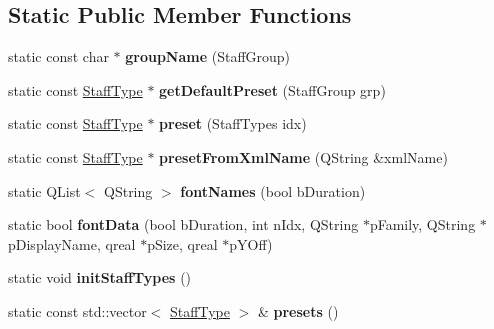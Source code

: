 \subsection*{Static Public Member Functions}
\begin{DoxyCompactItemize}
\item 
\mbox{\label{class_ms_1_1_staff_type_ae6db1131f3d20a99edd92957e6c57c04}} 
static const char $\ast$ {\bfseries group\+Name} (Staff\+Group)
\item 
\mbox{\label{class_ms_1_1_staff_type_afe6ed22d56e84a04c80e666ecccd9e0d}} 
static const \hyperlink{class_ms_1_1_staff_type}{Staff\+Type} $\ast$ {\bfseries get\+Default\+Preset} (Staff\+Group grp)
\item 
\mbox{\label{class_ms_1_1_staff_type_a9c32ffbc0aaac4b987b61bb35777f093}} 
static const \hyperlink{class_ms_1_1_staff_type}{Staff\+Type} $\ast$ {\bfseries preset} (Staff\+Types idx)
\item 
\mbox{\label{class_ms_1_1_staff_type_ac830caf5d8a1f2a0dc426ec40fc3d049}} 
static const \hyperlink{class_ms_1_1_staff_type}{Staff\+Type} $\ast$ {\bfseries preset\+From\+Xml\+Name} (Q\+String \&xml\+Name)
\item 
\mbox{\label{class_ms_1_1_staff_type_af8f369415a01c6d7b8a170355e5d4137}} 
static Q\+List$<$ Q\+String $>$ {\bfseries font\+Names} (bool b\+Duration)
\item 
\mbox{\label{class_ms_1_1_staff_type_a9843e5c91552630a54d176416d41b9a9}} 
static bool {\bfseries font\+Data} (bool b\+Duration, int n\+Idx, Q\+String $\ast$p\+Family, Q\+String $\ast$p\+Display\+Name, qreal $\ast$p\+Size, qreal $\ast$p\+Y\+Off)
\item 
\mbox{\label{class_ms_1_1_staff_type_a9e2e6e7295117c552eaff1c8037e8309}} 
static void {\bfseries init\+Staff\+Types} ()
\item 
\mbox{\label{class_ms_1_1_staff_type_ae041de87e8304561c6a4d179c12bd6bc}} 
static const std\+::vector$<$ \hyperlink{class_ms_1_1_staff_type}{Staff\+Type} $>$ \& {\bfseries presets} ()

\end{DoxyCompactItemize}
